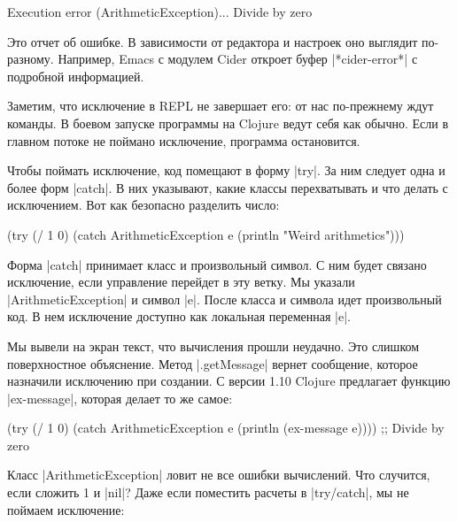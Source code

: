 \begin{english}
  \begin{text}
Execution error (ArithmeticException)...
Divide by zero
  \end{text}
\end{english}

Это отчет об ошибке. В зависимости от редактора и настроек оно выглядит
по-разному. Например, Emacs с модулем Cider откроет буфер \spverb|*cider-error*|
с подробной информацией.

Заметим, что исключение в REPL не завершает его: от нас по-прежнему ждут
команды. В боевом запуске программы на Clojure ведут себя как обычно. Если в
главном потоке не поймано исключение, программа остановится.

Чтобы поймать исключение, код помещают в форму \spverb|try|. За ним следует одна
и более форм \spverb|catch|. В них указывают, какие классы перехватывать и что
делать с исключением. Вот как безопасно разделить число:

\begin{english}
  \begin{clojure}
(try
  (/ 1 0)
  (catch ArithmeticException e
    (println "Weird arithmetics")))
  \end{clojure}
\end{english}

Форма \spverb|catch| принимает класс и произвольный символ. С ним будет связано
исключение, если управление перейдет в эту ветку. Мы указали
\spverb|ArithmeticException| и символ \spverb|e|. После класса и символа идет
произвольный код. В нем исключение доступно как локальная переменная \spverb|e|.

Мы вывели на экран текст, что вычисления прошли неудачно. Это слишком
поверхностное объяснение. Метод \spverb|.getMessage| вернет сообщение, которое
назначили исключению при создании. С версии 1.10 Clojure предлагает функцию
\spverb|ex-message|, которая делает то же самое:

\begin{english}
  \begin{clojure}
(try
  (/ 1 0)
  (catch ArithmeticException e
    (println (ex-message e))))
;; Divide by zero
  \end{clojure}
\end{english}

Класс \spverb|ArithmeticException| ловит не все ошибки вычислений. Что случится,
если сложить 1 и \spverb|nil|? Даже если поместить расчеты в \spverb|try/catch|,
мы не поймаем исключение:

